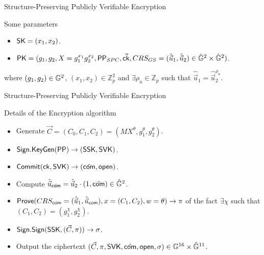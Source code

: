 \begin{frame}{Structure-Preserving Publicly Verifiable Encryption}
  
  \begin{block}{Some parameters}
    
    \begin{itemize}
    \item $\mathsf{SK} = (x_1, x_2)$.
    \item $\mathsf{PK} = (g_1, g_2, X = g_1^{x_1}g_2^{x_2}, \mathsf{PP}_{SPC}, \vec{\mathsf{ck}}, CRS_{GS} = (\hat{\vec{u}}_1, \hat{\vec{u}}_2) \in \hat{\mathbb{G}}^2 \times \hat{\mathbb{G}}^2)$.
    \end{itemize}
    where $(g_1, g_2) \in \mathbb{G}^2$, $(x_1, x_2) \in \mathbb{Z}_p^2$ and $\exists \rho_u \in \mathbb{Z}_p$ such that $\hat{\vec{u}}_1 = \hat{\vec{u}}_2^{\rho_u}$.
  \end{block}
  
\end{frame}

\begin{frame}{Structure-Preserving Publicly Verifiable Encryption}
  \begin{block}{Details of the Encryption algorithm}
   
    \begin{itemize}
    \item Generate $\vec{C} = (C_0, C_1, C_2) = (MX^{\theta}, g_1^{\theta},  g_2^{\theta})$.
    \item ${\mathsf{Sign}}.{\mathsf{KeyGen}}(\mathsf{PP}) \to (\mathsf{SSK}, \mathsf{SVK})$.
    \item ${\mathsf{Commit}}(\mathsf{ck}, \mathsf{SVK}) \to (\hat{\mathsf{com}}, \mathsf{open})$.
    \item Compute $\hat{\vec{u}}_{\hat{\mathsf{com}}} = \hat{\vec{u}}_2 \cdot (1, \hat{\mathsf{com}}) \in \hat{\mathbb{G}}^2$.
    \item ${\mathsf{Prove}}(CRS_{\hat{\mathsf{com}}} = (\hat{\vec{u}}_1, \hat{\vec{u}}_{\mathsf{com}}), x = (C_1, C_2), w = \theta) \to \pi$ of the fact $\exists \chi$ such that $(C_1, C_2) = (g_1^\chi, g_2^\chi)$.
    \item ${\mathsf{Sign}}.{\mathsf{Sign}}(\mathsf{SSK},(\vec{C},\pi)) \to \sigma$.
    \item Output the ciphertext $(\vec{C}, \pi, \mathsf{SVK}, \hat{\mathsf{com}}, \mathsf{open}, \sigma) \in \mathbb{G}^{16} \times \hat{\mathbb{G}}^{11}$.
    \end{itemize}

  \end{block}
\end{frame}


